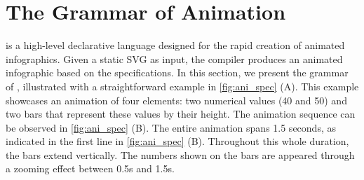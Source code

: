 \section{The \gaia{} Grammar of Animation}
\label{sec:gaia_ani}

%

\gaia{} is a high-level declarative language designed for the rapid creation of animated infographics. 
Given a static SVG as input, the \gaia{} compiler produces an animated infographic based on the \gaia{} specifications. 
In this section, we present the grammar of \gaia{}, illustrated with a straightforward example in \autoref{fig:ani_spec} (A). 
This example showcases an animation of four elements: two numerical values (40 and 50) and two bars that represent these values by their height. 
The animation sequence can be observed in \autoref{fig:ani_spec} (B). 
The entire animation spans 1.5 seconds, as indicated in the first line in \autoref{fig:ani_spec} (B). 
Throughout this whole duration, the bars extend vertically. 
The numbers shown on the bars are appeared through a zooming effect between 0.5s and 1.5s.






